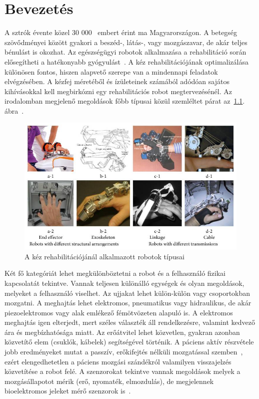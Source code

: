 \chapter{Bevezetés}

A sztrók évente közel 30 000~\cite{Bereczki2023} embert érint ma Magyarországon. A betegség szövődményei között gyakori 
a beszéd-, látás-, vagy mozgászavar, de akár teljes bénulást is okozhat. Az egészségügyi robotok alkalmazása a 
rehabilitáció során elősegítheti a hatékonyabb gyógyulást~\cite{Chang2013}. A kéz rehabilitációjának optimalizálása 
különösen fontos, hiszen alapvető szerepe van a mindennapi feladatok elvégzésében. A kézfej méretéből és ízületeinek számából 
adódóan sajátos kihívásokkal kell megbirkózni egy rehabilitációs robot megtervezésénél.
Az irodalomban megjelenő megoldások főbb típusai közül szemléltet párat az~\ref{fig:hand_rehab_robot_types}. ábra~\cite{Yue2017}.
\begin{figure}[ht]
    \begin{center}
    \includegraphics[width=12cm]{images/hand_rehab_robot_types.jpeg}
    \caption{A kéz rehabilitációjánál alkalmazott robotok típusai}\label{fig:hand_rehab_robot_types}
    \end{center}
\end{figure}
Két fő kategóriát lehet megkülönböztetni a robot és a felhasználó fizikai kapcsolatát tekintve. Vannak teljesen 
különálló egységek és olyan megoldások, melyeket a felhasználó viselhet. Az ujjakat lehet külön-külön vagy 
csoportokban mozgatni. A meghajtás lehet elektromos, pneumatikus vagy hidraulikus, de akár piezoelektromos vagy 
alak emlékező fémötvözeten alapuló is. A elektromos meghajtás igen elterjedt, mert széles választék áll rendelkezésre, 
valamint kedvező ára és megbízhatósága miatt. Az erőátvitel lehet közvetlen, gyakran azonban közvetítő elem (csuklók, kábelek) 
segítségével történik. A páciens aktív részvétele jobb eredményeket mutat a passzív, erőkifejtés nélküli mozgatással 
szemben~\cite{Remsik2016}, ezért elengedhetetlen a páciens mozgási szándékról valamilyen visszajelzés közvetítése a robot felé.
A szenzorokat tekintve vannak megoldások melyek a mozgásállapotot mérik (erő, nyomaték, elmozdulás), de megjelennek 
bioelektromos jeleket mérő szenzorok is~\cite{Satakogiou}. 

